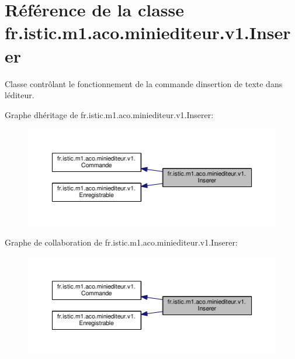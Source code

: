 \hypertarget{classfr_1_1istic_1_1m1_1_1aco_1_1miniediteur_1_1v1_1_1Inserer}{}\section{Référence de la classe fr.\+istic.\+m1.\+aco.\+miniediteur.\+v1.\+Inserer}
\label{classfr_1_1istic_1_1m1_1_1aco_1_1miniediteur_1_1v1_1_1Inserer}


Classe contrôlant le fonctionnement de la commande d\textquotesingle{}insertion de texte dans l\textquotesingle{}éditeur.  




Graphe d\textquotesingle{}héritage de fr.\+istic.\+m1.\+aco.\+miniediteur.\+v1.\+Inserer\+:
\nopagebreak
\begin{figure}[H]
\begin{center}
\leavevmode
\includegraphics[width=350pt]{classfr_1_1istic_1_1m1_1_1aco_1_1miniediteur_1_1v1_1_1Inserer__inherit__graph}
\end{center}
\end{figure}


Graphe de collaboration de fr.\+istic.\+m1.\+aco.\+miniediteur.\+v1.\+Inserer\+:
\nopagebreak
\begin{figure}[H]
\begin{center}
\leavevmode
\includegraphics[width=350pt]{classfr_1_1istic_1_1m1_1_1aco_1_1miniediteur_1_1v1_1_1Inserer__coll__graph}
\end{center}
\end{figure}
